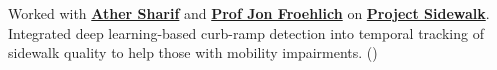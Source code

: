 \documentclass[]{deedy-resume-openfont}
\renewcommand{\thefootnote}{\fnsymbol{footnote}}
\begin{document}
\begin{paracol}{2}
Worked with \textbf{\href{https://athersharif.me}{Ather Sharif}} and \textbf{\href{https://makeabilitylab.cs.washington.edu/member/jonfroehlich/}{Prof Jon Froehlich}} on \textbf{\href{https://makeabilitylab.cs.washington.edu/project/sidewalk/}{Project Sidewalk}}. Integrated deep learning-based curb-ramp detection into temporal tracking of sidewalk quality to help those with mobility impairments. (\cite{SharifGSBFWDF21})
\sectionsep



\end{paracol}
\renewcommand{\thefootnote}{\fnsymbol{footnote}}
\end{document}
